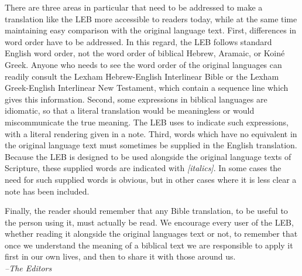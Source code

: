 There are three areas in particular that need to be addressed to make a translation like the LEB more accessible to readers 
today, while at the same time maintaining easy comparison with the original language text. First, differences in word order 
have to be addressed. In this regard, the LEB follows standard English word order, not the word order of biblical Hebrew, 
Aramaic, or Koiné Greek. Anyone who needs to see the word order of the original languages can readily consult the Lexham 
Hebrew-English Interlinear Bible or the Lexham Greek-English Interlinear New Testament, which contain a sequence line which 
gives this information. Second, some expressions in biblical languages are idiomatic, so that a literal translation would 
be meaningless or would miscommunicate the true meaning. The LEB uses  to indicate such expressions, 
with a literal rendering given in a note. Third, words which have no equivalent in the original language text must sometimes 
be supplied in the English translation. Because the LEB is designed to be used alongside the original language texts of 
Scripture, these supplied words are indicated with \textit{[italics]}. In some cases the need for such supplied words is obvious, 
but in other cases where it is less clear a note has been included.\par
Finally, the reader should remember that any Bible translation, to be useful to the person using it, must actually be read. 
We encourage every user of the LEB, whether reading it alongside the original languages text or not, to remember that once 
we understand the meaning of a biblical text we are responsible to apply it first in our own lives, and then to share it 
with those around us.\\
\textit{--The Editors}\par




